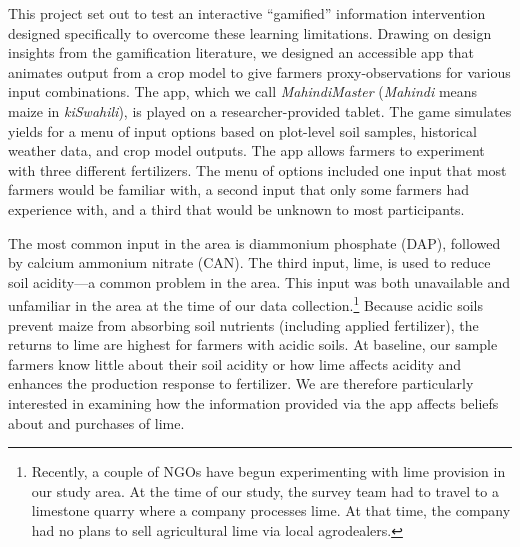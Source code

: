 \documentclass[12pt,letterpaper]{article}
\begin{document}



This project set out to test an interactive ``gamified'' information intervention designed specifically to overcome these learning limitations. Drawing on design insights from the gamification literature, we designed an accessible app that animates output from a crop model to give farmers proxy-observations for various input combinations. The app, which we call \textit{MahindiMaster} (\textit{Mahindi} means maize in \textit{kiSwahili}), is played on a researcher-provided tablet. The game simulates yields for a menu of input options based on plot-level soil samples, historical weather data, and crop model outputs. The app allows farmers to experiment with three different fertilizers. The menu of options included one input that most farmers would be familiar with, a second input that only some farmers had experience with, and a third that would be unknown to most participants. 

The most common input in the area is diammonium phosphate (DAP), followed by calcium ammonium nitrate (CAN). The third input, lime, is used to reduce soil acidity---a common problem in the area. This input was both unavailable and unfamiliar in the area at the time of our data collection.\footnote{Recently, a couple of NGOs have begun experimenting with lime provision in our study area. At the time of our study, the survey team had to travel to a limestone quarry where a company processes lime. At that time, the company had no plans to sell agricultural lime via local agrodealers.} Because acidic soils prevent maize from absorbing soil nutrients (including applied fertilizer), the returns to lime are  highest for farmers with acidic soils. At baseline, our sample farmers know little about their soil acidity or how lime affects acidity and enhances the production response to fertilizer. We are therefore particularly interested in examining how the information provided via the app affects beliefs about and purchases of lime. 
\end{document}
